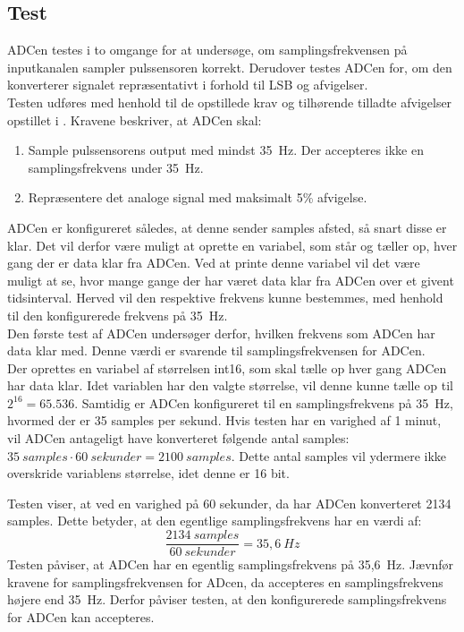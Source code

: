 \subsection{Test}
ADCen testes i to omgange for at undersøge, om samplingsfrekvensen på inputkanalen sampler pulssensoren korrekt. Derudover testes ADCen for, om den konverterer signalet repræsentativt i forhold til LSB og afvigelser. \\
Testen udføres med henhold til de opstillede krav og tilhørende tilladte afvigelser opstillet i . Kravene beskriver, at ADCen skal:
\begin{enumerate}
	\item Sample pulssensorens output med mindst 35~Hz. Der accepteres ikke en samplingsfrekvens under 35~Hz. 
	\item Repræsentere det analoge signal med maksimalt 5\% afvigelse. 
\end{enumerate}

ADCen er konfigureret således, at denne sender samples afsted, så snart disse er klar. Det vil derfor være muligt at oprette en variabel, som står og tæller op, hver gang der er data klar fra ADCen. Ved at printe denne variabel vil det være muligt at se, hvor mange gange der har været data klar fra ADCen over et givent tidsinterval. Herved vil den respektive frekvens kunne bestemmes, med henhold til den konfigurerede frekvens på 35~Hz. \\
Den første test af ADCen undersøger derfor, hvilken frekvens som ADCen har data klar med. Denne værdi er svarende til samplingsfrekvensen for ADCen.\\
Der oprettes en variabel af størrelsen int16, som skal tælle op hver gang ADCen har data klar. Idet variablen har den valgte størrelse, vil denne kunne tælle op til $2^{16} = 65.536$. Samtidig er ADCen konfigureret til en samplingsfrekvens på 35~Hz, hvormed der er 35 samples per sekund. Hvis testen har en varighed af 1 minut, vil ADCen antageligt have konverteret følgende antal samples: $35~samples \cdot 60~sekunder = 2100~samples$. Dette antal samples vil ydermere ikke overskride variablens størrelse, idet denne er 16 bit.

Testen viser, at ved en varighed på 60 sekunder, da har ADCen konverteret 2134 samples. Dette betyder, at den egentlige samplingsfrekvens har en værdi af:
\begin{equation}
\frac{2134~samples}{60~sekunder} = 35,6~Hz 
\end{equation}
Testen påviser, at ADCen har en egentlig samplingsfrekvens på 35,6~Hz. Jævnfør kravene for samplingsfrekvensen for ADcen, da accepteres en samplingsfrekvens højere end 35~Hz. Derfor påviser testen, at den konfigurerede samplingsfrekvens for ADCen kan accepteres. 

